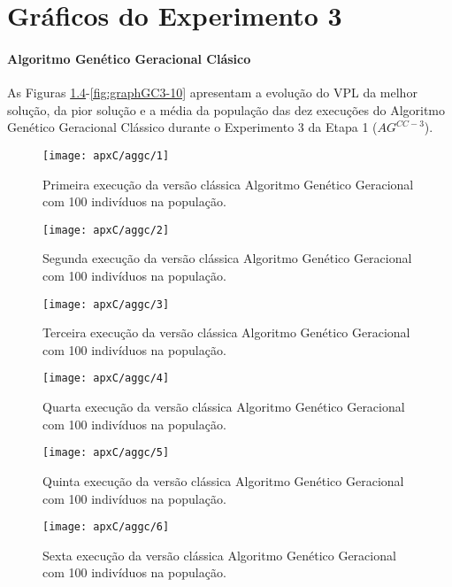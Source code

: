 \chapter{Gráficos do Experimento 3}
\subsubsection{Algoritmo Genético Geracional Clásico}
As Figuras \ref{fig:graphGC3-01}-\ref{fig:graphGC3-10} apresentam a evolução do VPL da melhor solução, da pior solução e a média da população das dez execuções do Algoritmo Genético Geracional Clássico durante o Experimento 3 da Etapa 1 ($AG^{CC-3}$).

\begin{figure}[H]
\centering
\texttt{[image: apxC/aggc/1]}
\caption{Primeira execução da versão clássica Algoritmo Genético Geracional com 100 indivíduos na população.}
\label{fig:graphGC3-01}
\end{figure}

\begin{figure}[H]
\centering
\texttt{[image: apxC/aggc/2]}
\caption{Segunda execução da versão clássica Algoritmo Genético Geracional com 100 indivíduos na população.}
\label{fig:graphGC3-02}
\end{figure}

\begin{figure}[H]
\centering
\texttt{[image: apxC/aggc/3]}
\caption{Terceira execução da versão clássica Algoritmo Genético Geracional com 100 indivíduos na população.}
\label{fig:graphGC3-03}
\end{figure}

\begin{figure}[H]
\centering
\texttt{[image: apxC/aggc/4]}
\caption{Quarta execução da versão clássica Algoritmo Genético Geracional com 100 indivíduos na população.}
\label{fig:graphGC3-01}
\end{figure}

\begin{figure}[H]
\centering
\texttt{[image: apxC/aggc/5]}
\caption{Quinta execução da versão clássica Algoritmo Genético Geracional com 100 indivíduos na população.}
\label{fig:graphGC3-05}
\end{figure}

\begin{figure}[H]
\centering
\texttt{[image: apxC/aggc/6]}
\caption{Sexta execução da versão clássica Algoritmo Genético Geracional com 100 indivíduos na população.}
\label{fig:graphGC3-06}
\end{figure}

